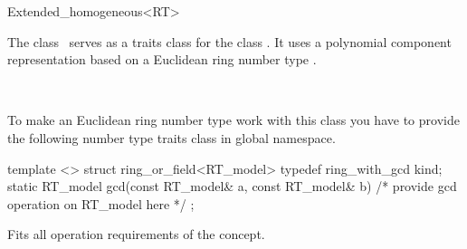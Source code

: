 
\ccAutoIndexingOff
\begin{ccRefClass}{Extended_homogeneous<RT>}
\ccAutoIndexingOn
{}

\ccDefinition
  
The class \ccRefName\ serves as a traits class for the class
.  It uses a polynomial component
representation based on a Euclidean ring number type .


\ccIsModel

%
 \\

\ccCreation
{}  %



To make an Euclidean ring number type
 work with this class you have to provide the following
number type traits class in global namespace.

\begin{ccExampleCode}
template <>
struct ring_or_field<RT_model> {
  typedef ring_with_gcd kind;
  static RT_model gcd(const RT_model& a, const RT_model& b) 
  { /* provide gcd operation on RT_model here */ }
};    
\end{ccExampleCode}

\ccOperations

Fits all operation requirements of the concept.

\ccSeeAlso

 \\


\ccIndexTraitsClassEnd
\ccAutoIndexingOff
\end{ccRefClass}
\ccAutoIndexingOn

